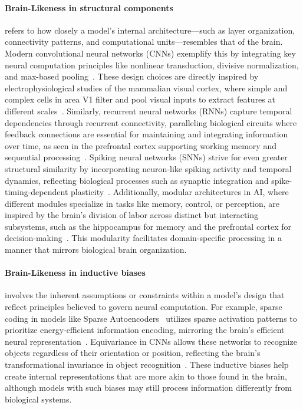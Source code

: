 \paragraph{Brain-Likeness in structural components} refers to how closely a model’s internal architecture---such as layer organization, connectivity patterns, and computational units---resembles that of the brain. Modern convolutional neural networks (CNNs) exemplify this by integrating key neural computation principles like nonlinear transduction, divisive normalization, and max-based pooling~\citep{yamins2016using}. These design choices are directly inspired by electrophysiological studies of the mammalian visual cortex, where simple and complex cells in area V1 filter and pool visual inputs to extract features at different scales~\citep{Hubel1962}. Similarly, recurrent neural networks (RNNs) capture temporal dependencies through recurrent connectivity, paralleling biological circuits where feedback connections are essential for maintaining and integrating information over time, as seen in the prefrontal cortex supporting working memory and sequential processing~\citep{goldman1995cellular}. Spiking neural networks (SNNs) strive for even greater structural similarity by incorporating neuron-like spiking activity and temporal dynamics, reflecting biological processes such as synaptic integration and spike-timing-dependent plasticity~\citep{gerstner2002spiking}. Additionally, modular architectures in AI, where different modules specialize in tasks like memory, control, or perception, are inspired by the brain’s division of labor across distinct but interacting subsystems, such as the hippocampus for memory and the prefrontal cortex for decision-making~\citep{anderson2004integrated}. This modularity facilitates domain-specific processing in a manner that mirrors biological brain organization.

\paragraph{Brain-Likeness in inductive biases} involves the inherent assumptions or constraints within a model’s design that reflect principles believed to govern neural computation. For example, sparse coding in models like Sparse Autoencoders~\citep{ng2011sparse} utilizes sparse activation patterns to prioritize energy-efficient information encoding, mirroring the brain’s efficient neural representation~\citep{olshausen2004sparse}. Equivariance in CNNs allows these networks to recognize objects regardless of their orientation or position, reflecting the brain’s transformational invariance in object recognition~\citep{yamins2016using}. These inductive biases help create internal representations that are more akin to those found in the brain, although models with such biases may still process information differently from biological systems.

